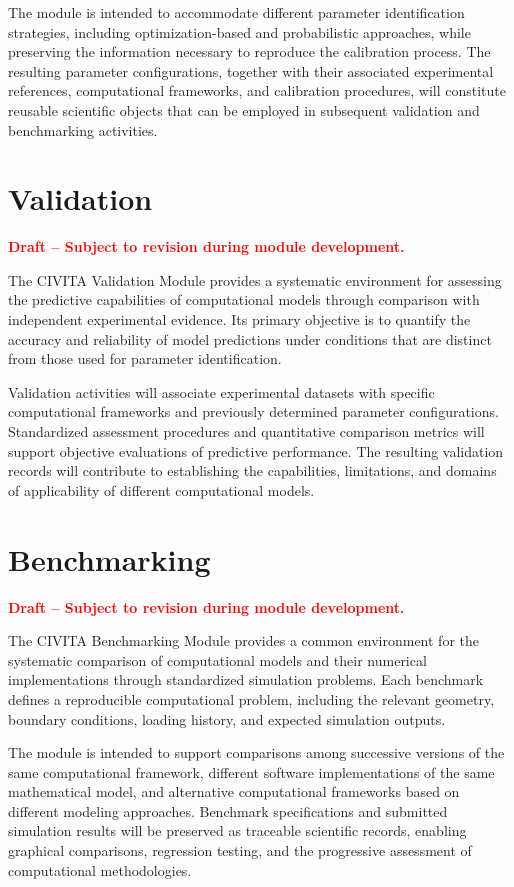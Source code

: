 The module is intended to accommodate different parameter identification strategies, including optimization-based and probabilistic approaches, while preserving the information necessary to reproduce the calibration process. The resulting parameter configurations, together with their associated experimental references, computational frameworks, and calibration procedures, will constitute reusable scientific objects that can be employed in subsequent validation and benchmarking activities.


\section{Validation}
\label{sec:civita-validation}

\noindent\textcolor{red}{\textbf{Draft -- Subject to revision during module development.}}

The CIVITA Validation Module provides a systematic environment for assessing the predictive capabilities of computational models through comparison with independent experimental evidence. Its primary objective is to quantify the accuracy and reliability of model predictions under conditions that are distinct from those used for parameter identification.

Validation activities will associate experimental datasets with specific computational frameworks and previously determined parameter configurations. Standardized assessment procedures and quantitative comparison metrics will support objective evaluations of predictive performance. The resulting validation records will contribute to establishing the capabilities, limitations, and domains of applicability of different computational models.


\section{Benchmarking}
\label{sec:civita-benchmarking}

\noindent\textcolor{red}{\textbf{Draft -- Subject to revision during module development.}}

The CIVITA Benchmarking Module provides a common environment for the systematic comparison of computational models and their numerical implementations through standardized simulation problems. Each benchmark defines a reproducible computational problem, including the relevant geometry, boundary conditions, loading history, and expected simulation outputs.

The module is intended to support comparisons among successive versions of the same computational framework, different software implementations of the same mathematical model, and alternative computational frameworks based on different modeling approaches. Benchmark specifications and submitted simulation results will be preserved as traceable scientific records, enabling graphical comparisons, regression testing, and the progressive assessment of computational methodologies.


